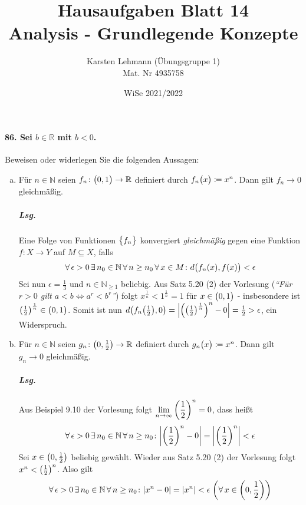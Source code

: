 \documentclass{scrreprt}
\author{Karsten Lehmann (Übungsgruppe 1)\\Mat. Nr 4935758}
\date{WiSe 2021/2022}
\title{Hausaufgaben Blatt 14\\Analysis - Grundlegende Konzepte}
\begin{document}
\paragraph{86. Sei $b \in \mathbb{R}$ mit $b < 0$.}
Beweisen oder widerlegen Sie die folgenden Aussagen:
\begin{enumerate}[(a)]
\item Für $n \in \mathbb{N}$ seien $f_n \colon \qty\big(0, 1) \to \mathbb{R}$
  definiert durch $f_n\qty\big(x) \coloneqq x^n$.
  Dann gilt $f_n \to 0$ gleichmäßig.
  \subparagraph{Lsg.} Eine Folge von Funktionen $\qty\big{f_n}$ konvergiert
  \emph{gleichmäßig} gegen eine Funktion $f \colon X \to Y$ auf $M \subseteq X$,
  falls
  \[
    \forall\, \epsilon > 0 \,\exists\, n_0 \in \mathbb{N}
    \,\forall\, n \geq n_0 \,\forall\, x \in M \colon
    d\qty\big(f_n(x), f(x)) < \epsilon
  \]
  Sei nun $\epsilon = \frac{1}{3}$ und $n \in \mathbb{N}_{\geq 1}$ beliebig.
  Aus Satz 5.20 (2) der Vorlesung
  (\emph{``Für $r > 0$ gilt $a < b \iff a^r < b^r$''}) folgt
  $x^{\frac{1}{n}} < 1^{\frac{1}{n}} = 1$ für $x \in \qty\big(0, 1)$
  - insbesondere ist $\qty(\frac{1}{2})^{\frac{1}{n}} \in \qty\big(0, 1)$.
  Somit ist nun $d\qty(f_n\qty(\frac{1}{2}), 0) =
  \abs{\qty(\qty(\frac{1}{2})^{\frac{1}{n}})^n - 0} = \frac{1}{2} > \epsilon$,
  ein Widerspruch.

\item Für $n \in \mathbb{N}$ seien
  $g_n \colon \qty(0, \frac{1}{2}) \to \mathbb{R}$ definiert durch
  $g_n\qty\big(x) \coloneqq x^n$.
  Dann gilt $g_n \to 0$ gleichmäßig.
  \subparagraph{Lsg.} Aus Beispiel 9.10 der Vorlesung folgt
  $\displaystyle \lim_{n \to \infty} \qty(\frac{1}{2})^n = 0$, dass
  heißt
  \[
    \forall\, \epsilon > 0 \,\exists\, n_0 \in \mathbb{N}
    \,\forall\, n \geq n_0 \colon \abs{\qty(\frac{1}{2})^n - 0} =
    \abs{\qty(\frac{1}{2})^n} < \epsilon
  \]
  Sei $x \in \qty(0, \frac{1}{2})$ beliebig gewählt.
  Wieder aus Satz 5.20 (2) der Vorlesung folgt $x^n < \qty(\frac{1}{2})^n$.
  Also gilt
  \[
    \forall\, \epsilon > 0 \,\exists\, n_0 \in \mathbb{N}
    \,\forall\, n \geq n_0 \colon \abs{x^n - 0} =
    \abs{x^n} < \epsilon \; \qty(\forall\, x \in \qty(0, \frac{1}{2}))
  \]
\end{enumerate}
\end{document}
